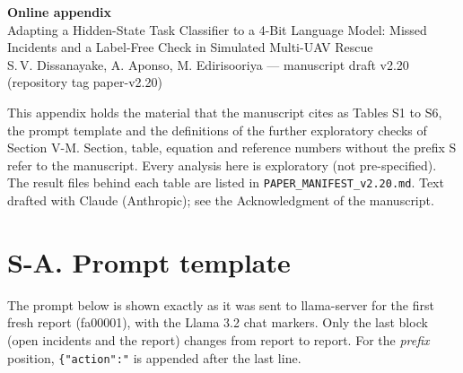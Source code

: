 \documentclass[10pt]{article}
\begin{document}
\begin{center}
{\large\bfseries Online appendix}\\[4pt]
Adapting a Hidden-State Task Classifier to a 4-Bit Language Model: Missed Incidents and a Label-Free Check in Simulated Multi-UAV Rescue\\[2pt]
S.\,V. Dissanayake, A. Aponso, M. Edirisooriya --- manuscript draft v2.20 (repository tag paper-v2.20)
\end{center}

This appendix holds the material that the manuscript cites as Tables S1 to S6, the prompt template and the definitions of the further
exploratory checks of Section V-M. Section, table, equation and reference numbers without the prefix S refer to the manuscript. Every
analysis here is exploratory (not pre-specified). The result files behind each table are listed in \texttt{PAPER\_MANIFEST\_v2.20.md}.
Text drafted with Claude (Anthropic); see the Acknowledgment of the manuscript.

\section*{S-A. Prompt template}


The prompt below is shown exactly as it was sent to llama-server for the first fresh report (fa00001), with the Llama 3.2 chat markers. Only the last block (open incidents and the report) changes from report to report. For the \textit{prefix} position, \texttt{\{"action":"} is appended after the last line.
\end{document}
